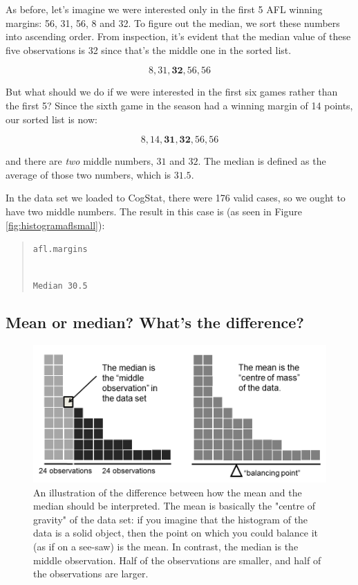 \documentclass[
  11pt,
  a4paper,
  twoside,symmetric,openright]{book}
\theoremstyle{break}
\theoremstyle{break}
\begin{document}
\begin{example}[Median]
\protect\hypertarget{exm:exmedian}{}\label{exm:exmedian}As before, let's imagine we were interested only in the first 5 AFL winning margins: 56, 31, 56, 8 and 32. To figure out the median, we sort these numbers into ascending order. From inspection, it's evident that the median value of these five observations is 32 since that's the middle one in the sorted list.

\[
8, 31, \mathbf{32}, 56, 56
\]

But what should we do if we were interested in the first six games rather than the first 5? Since the sixth game in the season had a winning margin of 14 points, our sorted list is now:

\[
8, 14, \mathbf{31}, \mathbf{32}, 56, 56
\]

and there are \emph{two} middle numbers, \(31\) and \(32\). The median is defined as the average of those two numbers, which is \(31.5\).
\end{example}

In the data set we loaded to CogStat, there were 176 valid cases, so we ought to have two middle numbers. The result in this case is (as seen in Figure \ref{fig:histogramaflsmall}):

\begin{quote}
\texttt{afl.margins}\strut \\
\texttt{Median\ 30.5}
\end{quote}

\subsection{Mean or median? What's the difference?}\label{mean-or-median-whats-the-difference}

\begin{figure}

{\centering \includegraphics[width=0.6\linewidth]{./resources/image/meanmedian} 

}

\caption[An illustration of the difference between how the mean and the median should be interpreted.]{An illustration of the difference between how the mean and the median should be interpreted. The mean is basically the "centre of gravity" of the data set: if you imagine that the histogram of the data is a solid object, then the point on which you could balance it (as if on a see-saw) is the mean. In contrast, the median is the middle observation. Half of the observations are smaller, and half of the observations are larger.}\label{fig:meanmedian}
\end{figure}
\end{document}
